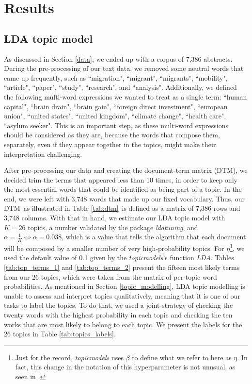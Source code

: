\section{Results} \label{results}

\subsection{LDA topic model} \label{results_topic_model}

As discussed in Section \ref{data}, we ended up with a corpus of 7,386 abstracts. During the pre-processing of our text data, we removed some neutral words that came up frequently, such as ``migration", ``migrant", ``migrants", ``mobility", ``article", ``paper", ``study", ``research", and ``analysis". Additionally, we defined the following multi-word expressions we wanted to treat as a single term: ``human capital", ``brain drain", ``brain gain", ``foreign direct investment", ``european union", ``united states", ``united kingdom", ``climate change", ``health care", ``asylum seeker". This is an important step, as these multi-word expressions should be considered as they are, because the words that compose them, separately, even if they appear together in the topics, might make their interpretation challenging.

After pre-processing our data and creating the document-term matrix (DTM), we decided trim the terms that appeared less than 10 times, in order to keep only the most essential words that could be identified as being part of a topic. In the end, we were left with 3,748 words that made up our fixed vocabulary. Thus, our DTM--as illustrated in Table \ref{tab:dtm}--is defined as a matrix of 7,386 rows and 3,748 columns. With that in hand, we estimate our LDA topic model with $K = 26$ topics, a number validated by the package  \textit{ldatuning}, and $\alpha = \frac{1}{K} \Leftrightarrow \alpha = 0.038$, which is a value that tells the algorithm that each document will be composed by a smaller number of very high-probability topics. For $\eta$\footnote{Just for the record, \textit{topicmodels} uses $\beta$ to define what we refer to here as $\eta$. In fact, this change in the notation of this hyperparameter is not unusual, as seen in \cite{ponweiser_latent_2012}.}, we used the default value of 0.1 given by the \textit{topicmodels}'s function \textit{LDA}. Tables \ref{tab:top_terms_1} and \ref{tab:top_terms_2} present the fifteen most likely terms from our 26 topics, which were taken from the matrix of per-topic word probabilities. As mentioned in Section \ref{topic_modelling}, LDA topic modelling is unable to assess and interpret topics qualitatively, meaning that it is one of our tasks to label the topics. To do that, we used a joint strategy of checking the twenty words with the highest probability in each topic and checking the ten works that are most likely to belong to each topic. We present the labels for the 26 topics in Table \ref{tab:topics_labels}. 

